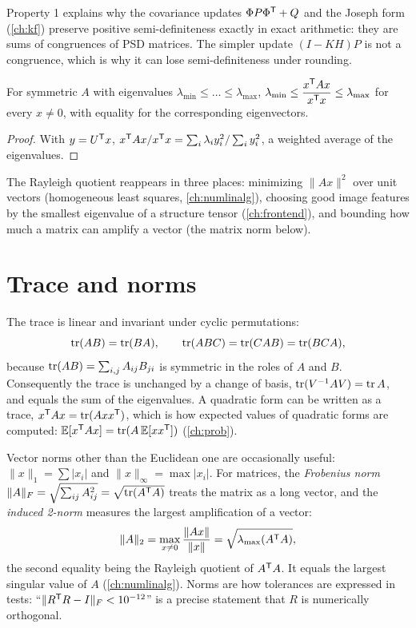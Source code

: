 Property 1 explains why the covariance updates $\Phi P\Phi^{\mathsf{T}} + Q$ and the Joseph form (\cref{ch:kf}) preserve positive
semi-definiteness exactly in exact arithmetic: they are sums of congruences of PSD matrices. The simpler update
$(I - KH)P$ is not a congruence, which is why it can lose semi-definiteness under rounding.

\begin{proposition}
\label{prop:rayleigh}
For symmetric $A$ with eigenvalues $\lambda_{\min} \le \dots \le \lambda_{\max}$,
$\lambda_{\min} \le \dfrac{x^{\mathsf{T}} Ax}{x^{\mathsf{T}} x} \le \lambda_{\max}$ for every $x \ne 0$, with equality for the corresponding eigenvectors.
\end{proposition}
\begin{proof}
With $y = U^{\mathsf{T}} x$, $x^{\mathsf{T}} Ax/x^{\mathsf{T}} x = \sum_i\lambda_iy_i^2/\sum_iy_i^2$, a weighted average of the eigenvalues.
\end{proof}

The Rayleigh quotient reappears in three places: minimizing $\|Ax\|^2$ over unit vectors (homogeneous least squares,
\cref{ch:numlinalg}), choosing good image features by the smallest eigenvalue of a structure tensor (\cref{ch:frontend}),
and bounding how much a matrix can amplify a vector (the matrix norm below).

\section{Trace and norms}

The trace is linear and invariant under cyclic permutations:
\begin{equation}
  \operatorname{tr}(AB) = \operatorname{tr}(BA), \qquad \operatorname{tr}(ABC) = \operatorname{tr}(CAB) = \operatorname{tr}(BCA),
\end{equation}
because $\operatorname{tr}(AB) = \sum_{i,j}A_{ij}B_{ji}$ is symmetric in the roles of $A$ and $B$. Consequently the trace is unchanged by a
change of basis, $\operatorname{tr}(V^{-1} AV) = \operatorname{tr} A$, and equals the sum of the eigenvalues. A quadratic form can be written as a trace,
$x^{\mathsf{T}} Ax = \operatorname{tr}(Axx^{\mathsf{T}})$, which is how expected values of quadratic forms are computed: $\mathbb{E}[x^{\mathsf{T}} Ax] = \operatorname{tr}(A\,\mathbb{E}[xx^{\mathsf{T}}])$
(\cref{ch:prob}).

Vector norms other than the Euclidean one are occasionally useful: $\|x\|_1 = \sum|x_i|$ and $\|x\|_\infty = \max|x_i|$. For
matrices, the \emph{Frobenius norm} $\|A\|_F = \sqrt{\sum_{ij}A_{ij}^2} = \sqrt{\operatorname{tr}(A^{\mathsf{T}} A)}$ treats the matrix as a long vector,
and the \emph{induced 2-norm} measures the largest amplification of a vector:
\begin{equation}
  \|A\|_2 = \max_{x\ne0}\frac{\|Ax\|}{\|x\|} = \sqrt{\lambda_{\max}(A^{\mathsf{T}} A)},
\end{equation}
the second equality being the Rayleigh quotient of $A^{\mathsf{T}} A$. It equals the largest singular value of $A$ (\cref{ch:numlinalg}).
Norms are how tolerances are expressed in tests: ``$\|R^{\mathsf{T}} R - I\|_F < 10^{-12}$'' is a precise statement that $R$ is
numerically orthogonal.

